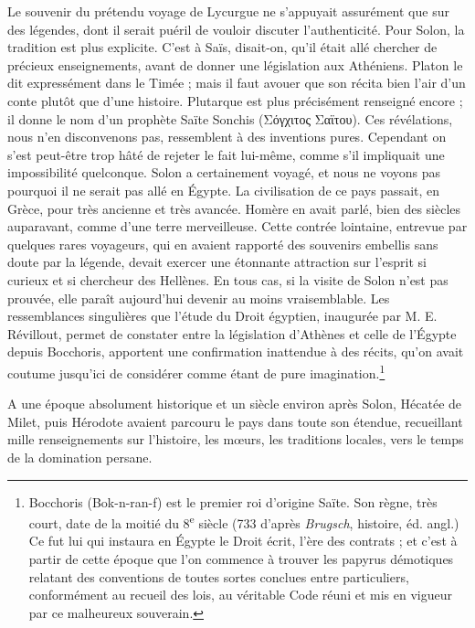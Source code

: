 \documentclass[a4paper, 11pt, oneside]{article}
\begin{document}
Le souvenir du prétendu voyage de Lycurgue ne s'appuyait assurément que sur des légendes, dont il serait puéril de vouloir discuter l'authenticité. Pour Solon, la tradition est plus explicite. C'est à Saïs, disait-on, qu'il était allé chercher de précieux enseignements, avant de donner une législation aux Athéniens. Platon le dit expressément dans le Timée ; mais il faut avouer que son récita bien l'air d'un conte plutôt que d'une histoire. Plutarque est plus précisément renseigné encore ; il donne le nom d'un prophète Saïte Sonchis (Σόγχιτος Σαϊτου). Ces révélations, nous n'en disconvenons pas, ressemblent à des inventions pures. Cependant on s'est peut-être trop hâté de rejeter le fait lui-même, comme s'il impliquait une impossibilité quelconque. Solon a certainement voyagé, et nous ne voyons pas pourquoi il ne serait pas allé en Égypte. La civilisation de ce pays passait, en Grèce, pour très ancienne et très avancée. Homère en avait parlé, bien des siècles auparavant, comme d'une terre merveilleuse. Cette contrée lointaine, entrevue par quelques rares voyageurs, qui en avaient rapporté des souvenirs embellis sans doute par la légende, devait exercer une étonnante attraction sur l'esprit si curieux et si chercheur des Hellènes. En tous cas, si la visite de Solon n'est pas prouvée, elle paraît aujourd'hui devenir au moins vraisemblable. Les ressemblances singulières que l'étude du Droit égyptien, inaugurée par M. E. Révillout, permet de constater entre la législation d'Athènes et celle de l'Égypte depuis Bocchoris, apportent une confirmation inattendue à des récits, qu'on avait coutume jusqu'ici de considérer comme étant de pure imagination.\footnote{Bocchoris (Bok-n-ran-f) est le premier roi d'origine Saïte. Son règne, très court, date de la moitié du 8\textsuperscript{e} siècle (733 d'après \emph{Brugsch}, histoire, éd. angl.) Ce fut lui qui instaura en Égypte le Droit écrit, l'ère des contrats ; et c'est à partir de cette époque que l'on commence à trouver les papyrus démotiques relatant des conventions de toutes sortes conclues entre particuliers, conformément au recueil des lois, au véritable Code réuni et mis en vigueur par ce malheureux souverain.}

A une époque absolument historique et un siècle environ après Solon, Hécatée de Milet, puis Hérodote avaient parcouru le pays dans toute son étendue, recueillant mille renseignements sur l'histoire, les mœurs, les traditions locales, vers le temps de la domination persane.
\end{document}
